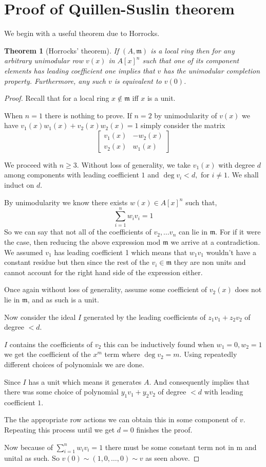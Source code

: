 \documentclass[12pt]{report}
\numberwithin{equation}{section}
\newcounter{dummy} \numberwithin{dummy}{section}
\newtheorem{theorem}[dummy]{Theorem}
\begin{document}
	\section{Proof of Quillen-Suslin theorem}
	We begin with a useful theorem due to Horrocks.
	\begin{theorem}[Horrocks' theorem]
	If $(A, \mathfrak{m})$ is a local ring then for any arbitrary unimodular row $v(x)$ in $A[x]^n$ such that one of its component elements has leading coefficient one implies that $v$ has the unimodular completion property. Furthermore, any such $v$ is equivalent to $v(0)$.
	\end{theorem}
	\begin{proof}
	Recall that for a local ring $x \not \in \mathfrak m$ iff $ x  $ is a unit.
	
	When $n=1 $ there is nothing to prove. If $n=2$ by unimodularity of $v(x)$ we have $v_1(x)w_1(x)+v_2(x)w_2(x)=1$ simply consider the matrix
	\[ \begin{bmatrix}
		v_1(x) & -w_2(x)\\
		v_2(x) & w_1(x)
	\end{bmatrix} \]
	
	We proceed with $n \geq 3$.
	Without loss of generality, we take $v_1(x)$ with degree $d $ among components with leading coefficient $1$ and $\deg v_i < d, $ for $i \neq 1$. We shall induct on $d$.
	
	By unimodularity we know there exists $w(x)\in A[x]^n$ such that,
	\[ \sum_{i=1}^n w_i v_i = 1 \]
	So we can say that not all of the coefficients of $v_2, \dots v_n $ can lie in $\mathfrak m$. For if it were the case, then reducing the above expression mod $\mathfrak m$ we arrive at a contradiction. We assumed $v_1 $ has leading coefficient 1 which means that $w_1v_1$ wouldn't have a constant residue but then since the rest of the $v_i \in \mathfrak{m}$ they are non units and cannot account for the right hand side of the expression either.
	
	Once again without loss of generality, assume some coefficient of $v_2(x)$ does not lie in $\mathfrak m$, and as such is a unit.
	
	Now consider the ideal $I$ generated by the leading coefficients of $z_1v_1+z_2v_2$ of degree $< d.$ 
	
	$I$ contains the coefficients of $v_2$ this can be inductively found when $w_1=0, w_2=1$ we get the coefficient of the $x^m$ term where $\deg v_2 = m$.
	Using repeatedly different choices of polynomials we are done.
	
	Since $I$ has a unit which means it generates $A$. And consequently implies that there was some choice of polynomial $y_1v_1+y_2v_2$ of degree $<d$ with leading coefficient $1$.
	
	The the appropriate row actions we can obtain this in some component of $v$. Repeating this process until we get $d=0$ finishes the proof.
	
	Now because of $\sum_{i=1}^n w_i v_i =1 $ there must be some constant term not in $\mathrm m $ and unital as such. So $v(0) \sim (1,0,\dots ,0 ) \sim v$ as seen above.
	\end{proof}
	
\end{document}
